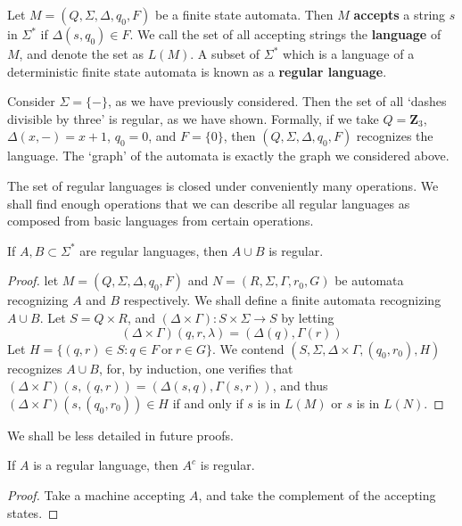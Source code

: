 \begin{definition}
    Let $M = (Q, \Sigma, \Delta, q_0, F)$ be a finite state automata. Then $M$ {\bf accepts} a string $s$ in $\Sigma^*$ if $\Delta(s,q_0) \in F$. We call the set of all accepting strings the {\bf language} of $M$, and denote the set as $L(M)$. A subset of $\Sigma^*$ which is a language of a deterministic finite state automata is known as a {\bf regular language}.
\end{definition}

\begin{example}
    Consider $\Sigma = \{ - \}$, as we have previously considered. Then the set of all `dashes divisible by three' is regular, as we have shown. Formally, if we take $Q = \mathbf{Z}_3$, $\Delta(x,-) = x+1$, $q_0 = 0$, and $F = \{ 0 \}$, then $(Q, \Sigma, \Delta, q_0, F)$ recognizes the language. The `graph' of the automata is exactly the graph we considered above.
\end{example}

The set of regular languages is closed under conveniently many operations. We shall find enough operations that we can describe all regular languages as composed from basic languages from certain operations.

\begin{theorem}
    If $A, B \subset \Sigma^*$ are regular languages, then $A \cup B$ is regular.
\end{theorem}
\begin{proof}
    let $M = (Q, \Sigma, \Delta, q_0, F)$ and $N = (R, \Sigma, \Gamma, r_0, G)$ be automata recognizing $A$ and $B$ respectively. We shall define a finite automata recognizing $A \cup B$. Let $S = Q \times R$, and $(\Delta \times \Gamma): S \times \Sigma \to S$ by letting
    \[ (\Delta \times \Gamma)(q,r,\lambda) = (\Delta(q), \Gamma(r)) \]
    Let $H = \{ (q,r) \in S : q \in F\ \text{or}\ r \in G \}$. We contend $(S, \Sigma, \Delta \times \Gamma, (q_0, r_0), H)$ recognizes $A \cup B$, for, by induction, one verifies that $(\Delta \times \Gamma)(s, (q,r)) = (\Delta(s,q), \Gamma(s,r))$, and thus $(\Delta \times \Gamma)(s, (q_0,r_0)) \in H$ if and only if $s$ is in $L(M)$ or $s$ is in $L(N)$.
\end{proof}

We shall be less detailed in future proofs.

\begin{theorem}
    If $A$ is a regular language, then $A^c$ is regular.
\end{theorem}
\begin{proof}
    Take a machine accepting $A$, and take the complement of the accepting states.
\end{proof}

